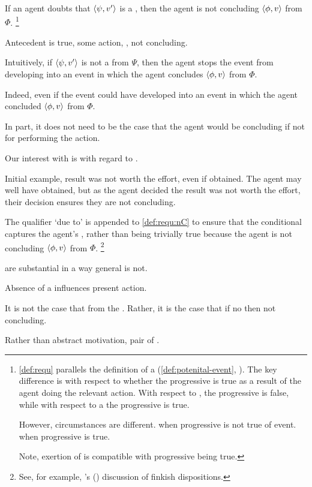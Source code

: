 \begin{note}
  If an agent doubts that \(\langle \psi, v' \rangle\) is a \fc{}, then the agent is not concluding \(\langle \phi, v \rangle\) from \(\Phi\).%
  \footnote{
    \autoref{def:requ} parallels the definition of a \pevent{} (\autoref{def:potenital-event}, ).
    The key difference is with respect to whether the progressive is true as a result of the agent doing the relevant action.
    With respect to \ninf{}, the progressive is false, while with respect to a  the progressive is true.

    However, circumstances are different.
    \pevent{} when progressive is not true of event.
    \ninf{} when progressive is true.

    Note, exertion of \ninf{} is compatible with progressive being true.
  }

  Antecedent is true, some action, \ninf{}, not concluding.

  Intuitively, if \(\langle \psi, v' \rangle\) is not a \fc{} from \(\Psi\), then the agent stops the event from developing into an event in which the agent concludes \(\langle \phi, v \rangle\) from \(\Phi\).

  Indeed, even if the event could have developed into an event in which the agent concluded \(\langle \phi, v \rangle\) from \(\Phi\).

  In part, it does not need to be the case that the agent would be concluding if not for performing the action.
\end{note}

\begin{note}
  Our interest with  is with regard to .

  Initial example, result was not worth the effort, even if obtained.
  The agent may well have obtained, but as the agent decided the result was not worth the effort, their decision ensures they are not concluding.
\end{note}

\begin{note}
  The qualifier `due to' is appended to \ref{def:requ:nC} to ensure that the conditional captures the agent's \ninf{}, rather than being trivially true because the agent is not concluding \(\langle \phi, v \rangle\) from \(\Phi\).%
  \footnote{
    See, for example, \citeauthor{Lewis:1997wg}'s (\citeyear{Lewis:1997wg}) discussion of finkish dispositions.
  }
\end{note}

\begin{note}
   are substantial in a way general \ninf{} is not.

  Absence of a \fc{} influences present action.

  It is not the case that from the \agpe{}.
  Rather, it is the case that if no \fc{} then not concluding.

  Rather than abstract motivation, pair of .
\end{note}

